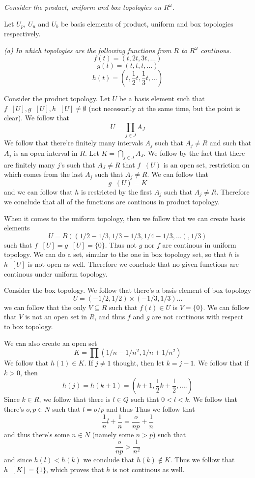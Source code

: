 \documentclass[11pt,oneside,titlepage]{book}
\DeclareMathOperator \inv {^{-1}}
\newcommand{\set}[1]{\{ #1 \}}
\begin{document}
\textit{Consider the product, uniform and box topologies on $R^\omega$.}

Let $U_p$, $U_u$ and $U_b$ be basis elements of product, uniform and box topologies respectively.

\textit{(a) In which topologies are the following functions from $R$ to $R^\omega$ continous.
  $$f(t) = (t, 2t, 3t, ...)$$
  $$g(t) = (t, t, t, ...)$$
  $$h(t) = (t, \frac{1}{2} t, \frac{1}{3} t, ...)$$
}

Consider the product topology. Let $U$ be a basis element such that $f\inv[U], g\inv[U],
h\inv[U] \neq \emptyset$ (not necessarily at the same time, but the point is clear).
We follow that
$$U = \prod_{j \in J}{A_J}$$
We follow that there're finitely many intervals $A_j$ such that $A_j \neq R$ and such that
$A_j$ is an open interval in $R$. Let $K = \bigcap_{j \in J} A_J$. We follow by the fact that
there are finitely many $j$'s such that $A_J \neq R$ that $f\inv(U)$ is an open set,
restriction on which comes from the last $A_j$ such that $A_j \neq R$. We can follow that 
$$g\inv(U) = K$$
and we can follow  that $h$ is restricted by the first $A_j$ such that $A_j \neq R$.
Therefore we conclude that all of the functions are continous in product topology.

When it comes to the uniform topology, then we follow that
we can create basis  elements 
$$U = B((1/2 - 1/3, 1/3 - 1/3, 1/4 - 1/3, ...), 1/3)$$
such that $f\inv[U] = g\inv[U] = \set{0}$. Thus not $g$ nor $f$ are continous in uniform
topology. We can do a set, simular to the one in box topology set, so that $h$ is
$h\inv[U]$ is not open as well. Therefore we conclude that no given functions are
continous under uniform topology.


Consider the box topology. We follow that there's a basis element of box topology
$$U = (-1/2, 1/2) \times (-1/3, 1/3) ... $$
we can follow that the only $V \subseteq R$ such that $f(t) \in U$ is $V = \set{0}$.
We can follow that $V$ is not an open set in $R$, and thus $f$ and $g$ are not continous
with respect to box topology.

We can also create an open set
$$K = \prod{(1/n - 1/n^{2}, 1/n + 1/n^2)}$$
We follow that $h(1) \in K$. If $j \neq 1$ thought, then let $k = j - 1$.
We follow that if $k > 0$, then
$$h(j) = h(k + 1) = (k + 1, \frac{1}{2}k + \frac{1}{2}, ....)$$
Since $k \in R$, we follow that there is $l \in Q$ such that $0 < l < k$.
We follow that there's $o, p \in N$ such that $l = o/p$ and thus
Thus we follow that
$$\frac{1}{n}l + \frac{1}{n} = \frac{o}{np} + \frac{1}{n}$$
and thus there's some  $n \in N$ (namely some $n > p$) such that
$$ \frac{o}{np} >  \frac{1}{n^2}$$
and since $h(l) < h(k)$ we conclude that $h(k) \notin K$. Thus we follow that
$h\inv[K] = \set{1}$, which proves that $h$ is not continous as well.
\end{document}
